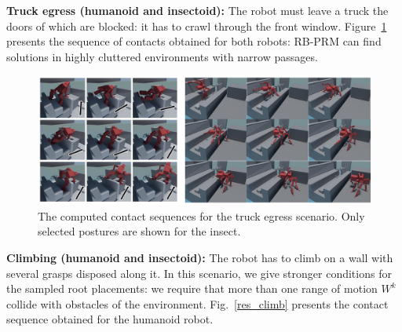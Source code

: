 \noindent\textbf{Truck egress (humanoid and insectoid):}
The robot must leave a truck the doors of which are blocked: it has to crawl through the front window.
Figure~\ref{res_truck_bd} presents the sequence of contacts obtained for both robots: RB-PRM can find solutions in highly cluttered environments with narrow passages.

\begin{figure}[h!]
  \centering
  \includegraphics[width=1\linewidth]{figures/climballlow}
  \caption{
           The computed contact sequences for the truck egress scenario. Only selected postures are shown for the insect.}
		   \label{res_truck_bd}
\end{figure}

\noindent\textbf{Climbing (humanoid and insectoid):}
The robot has to climb on a wall with several grasps disposed along it. In this scenario, we give stronger conditions for the sampled root placements: we require that more than one range of motion $W^k$ collide with obstacles of the environment. Fig.~\ref{res_climb} presents the contact sequence obtained for the 
humanoid robot.

